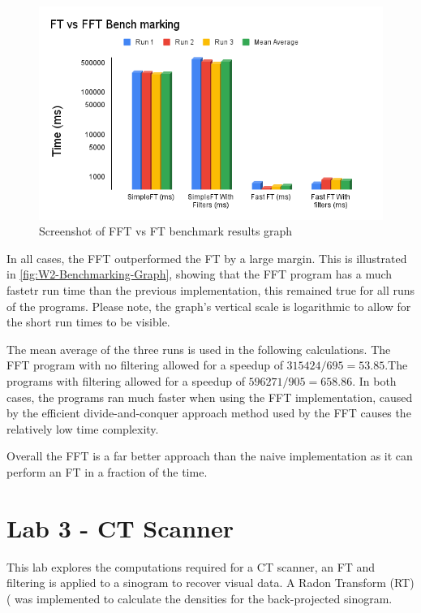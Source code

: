     \begin{figure}[H] 
        \centering
        \includegraphics[width=0.8\columnwidth]{Figures/Week 2/FT vs FFT Bench marking.png}
        \caption{Screenshot of FFT vs FT benchmark results graph}
        \label{fig:W2-Benchmarking-Graph}
    \end{figure}

    In all cases, the FFT outperformed the FT by a large margin. This is illustrated in \autoref{fig:W2-Benchmarking-Graph}, showing that the FFT program has a much fastetr run time than the previous implementation, this remained true for all runs of the programs. Please note, the graph's vertical scale is logarithmic to allow for the short run times to be visible.
    
    The mean average of the three runs is used in the following calculations. The FFT program with no filtering allowed for a speedup of  $315424 / 695 = 53.85$.The programs with filtering allowed for a speedup of $596271 / 905 = 658.86$. In both cases, the programs ran much faster when using the FFT implementation, caused by the efficient divide-and-conquer approach method used by the FFT causes the relatively low time complexity.

    Overall the FFT is a far better approach than the naive implementation as it can perform an FT in a fraction of the time.
    
\newpage
\section{Lab 3 - CT Scanner}

This lab explores the computations required for a CT scanner, an FT and filtering is applied to a sinogram to recover visual data. A Radon Transform (RT) (\textcite{4307775} was implemented to calculate the densities for the back-projected sinogram. 

